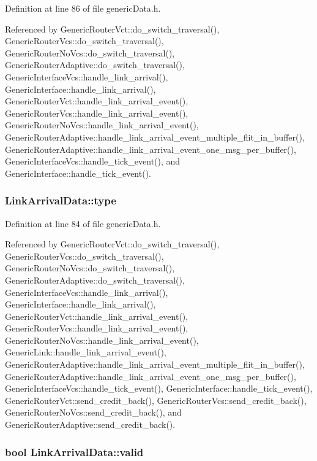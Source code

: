 Definition at line 86 of file genericData.h.

Referenced by GenericRouterVct::do\_\-switch\_\-traversal(), GenericRouterVcs::do\_\-switch\_\-traversal(), GenericRouterNoVcs::do\_\-switch\_\-traversal(), GenericRouterAdaptive::do\_\-switch\_\-traversal(), GenericInterfaceVcs::handle\_\-link\_\-arrival(), GenericInterface::handle\_\-link\_\-arrival(), GenericRouterVct::handle\_\-link\_\-arrival\_\-event(), GenericRouterVcs::handle\_\-link\_\-arrival\_\-event(), GenericRouterNoVcs::handle\_\-link\_\-arrival\_\-event(), GenericRouterAdaptive::handle\_\-link\_\-arrival\_\-event\_\-multiple\_\-flit\_\-in\_\-buffer(), GenericRouterAdaptive::handle\_\-link\_\-arrival\_\-event\_\-one\_\-msg\_\-per\_\-buffer(), GenericInterfaceVcs::handle\_\-tick\_\-event(), and GenericInterface::handle\_\-tick\_\-event().
\subsubsection[{type}]{ {\bf LinkArrivalData::type}}\label{classLinkArrivalData_67623829975f533c48e4b6552eed2780}




Definition at line 84 of file genericData.h.

Referenced by GenericRouterVct::do\_\-switch\_\-traversal(), GenericRouterVcs::do\_\-switch\_\-traversal(), GenericRouterNoVcs::do\_\-switch\_\-traversal(), GenericRouterAdaptive::do\_\-switch\_\-traversal(), GenericInterfaceVcs::handle\_\-link\_\-arrival(), GenericInterface::handle\_\-link\_\-arrival(), GenericRouterVct::handle\_\-link\_\-arrival\_\-event(), GenericRouterVcs::handle\_\-link\_\-arrival\_\-event(), GenericRouterNoVcs::handle\_\-link\_\-arrival\_\-event(), GenericLink::handle\_\-link\_\-arrival\_\-event(), GenericRouterAdaptive::handle\_\-link\_\-arrival\_\-event\_\-multiple\_\-flit\_\-in\_\-buffer(), GenericRouterAdaptive::handle\_\-link\_\-arrival\_\-event\_\-one\_\-msg\_\-per\_\-buffer(), GenericInterfaceVcs::handle\_\-tick\_\-event(), GenericInterface::handle\_\-tick\_\-event(), GenericRouterVct::send\_\-credit\_\-back(), GenericRouterVcs::send\_\-credit\_\-back(), GenericRouterNoVcs::send\_\-credit\_\-back(), and GenericRouterAdaptive::send\_\-credit\_\-back().
\subsubsection[{valid}]{\setlength{\rightskip}{0pt plus 5cm}bool {\bf LinkArrivalData::valid}}\label{classLinkArrivalData_2f9a1f28c8833db08318a1e2b018c9f8}




